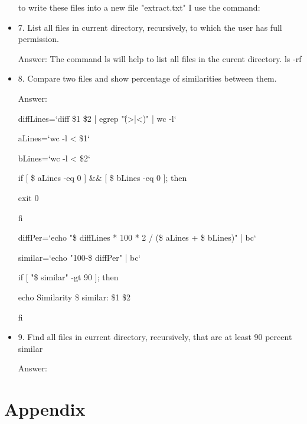 \documentclass[paper=a4, fontsize=11pt]{scrartcl}
\numberwithin{equation}{section}		%
\numberwithin{figure}{section}			%
\numberwithin{table}{section}				%
\begin{document}
\begin{itemize}
	to write these files into a new file "extract.txt" I use the command: 
	
	
	\item 7. List all files in current directory, recursively, to which the user has full permission.
	
	Answer: The command ls will help to list all files in the curent directory. 
	ls -rf
	
	\item 8. Compare two files and show percentage of similarities between them.
	
	Answer: 
	
	diffLines=`diff \$1 \$2 | egrep "\^(>|<)" | wc -l`
	
	aLines=`wc -l < \$1`
	
	bLines=`wc -l < \$2`
	
	if [ \$ aLines -eq 0 ] \&\& [ \$ bLines -eq 0 ]; then
	
		exit 0
		
	fi
	
	diffPer=`echo "\$ diffLines * 100 * 2 / (\$ aLines + \$ bLines)" | bc`
	
	similar=`echo "100-\$ diffPer" | bc`
	
	if [ "\$ similar" -gt 90 ]; then
	
		echo Similarity \$ similar: \$1 \$2
		
	fi	
	
	\item 9. Find all files in current directory, recursively, that are at least 90 percent similar
	
	Answer:  
	
    
   
\end{itemize}

\section{Appendix}
\end{document}
